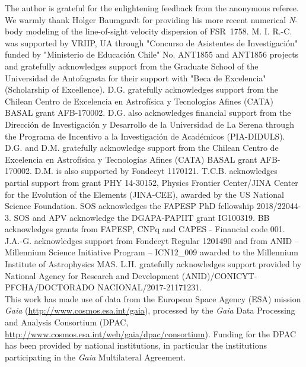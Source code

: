 \documentclass[longauth]{aa} %
\begin{document}
	\begin{acknowledgements}  
		The author is grateful for the enlightening feedback from the anonymous referee. We warmly thank Holger Baumgardt for providing his more recent numerical \textit{N}-body modeling of the line-of-sight velocity dispersion of FSR~1758.  M. I. R.-C. was supported by VRIIP, UA through  "Concurso de Asistentes de Investigaci\'on" funded by  "Ministerio de Educaci\'on Chile" No. ANT1855 and ANT1856 projects and gratefully acknowledges support from the Graduate School of the Universidad de Antofagasta for their support with "Beca de Excelencia" (Scholarship of Excellence). D.G. gratefully acknowledges support from the Chilean Centro de Excelencia en Astrof\'isica y Tecnolog\'ias Afines (CATA) BASAL grant AFB-170002. D.G. also acknowledges financial support from the Direcci\'on de Investigaci\'on y Desarrollo de la Universidad de La Serena through the Programa de Incentivo a la Investigaci\'on de Acad\'emicos (PIA-DIDULS). D.G. and D.M. gratefully acknowledge support from the Chilean Centro de Excelencia en Astrof\'isica y Tecnolog\'ias Afines (CATA) BASAL grant AFB-170002. D.M. is also supported by Fondecyt 1170121. T.C.B. acknowledges partial support from grant PHY 14-30152, Physics Frontier Center/JINA Center for the Evolution of the Elements (JINA-CEE), awarded by the US National Science Foundation. SOS acknowledges the FAPESP PhD fellowship 2018/22044-3. SOS and APV acknowledge the DGAPA-PAPIIT grant IG100319. BB acknowledges grants from FAPESP, CNPq and CAPES - Financial code 001. J.A.-G. acknowledges support from Fondecyt Regular 1201490 and from ANID -- Millennium Science Initiative Program -- ICN12\_009 awarded to the Millennium Institute of Astrophysics MAS. L.H. gratefully acknowledges support  provided by National Agency for Research and Development (ANID)/CONICYT-PFCHA/DOCTORADO NACIONAL/2017-21171231. \\

        This work has made use of data from the European Space Agency (ESA) mission \textit{Gaia} (\url{http://www.cosmos.esa.int/gaia}), processed by the \textit{Gaia} Data Processing and Analysis Consortium (DPAC, \url{http://www.cosmos.esa.int/web/gaia/dpac/consortium}). Funding for the DPAC has been provided by national institutions, in particular the institutions participating in the \textit{Gaia} Multilateral Agreement.\\


\end{acknowledgements}
\end{document}
